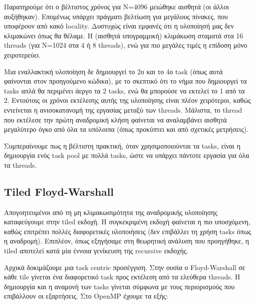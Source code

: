 \documentclass[12pt,titlepage]{article}
\begin{document}
Παρατηρούμε ότι ο βέλτιστος χρόνος για Ν=4096 μειώθηκε αισθητά (οι άλλοι
αυξήθηκαν). Επομένως υπάρχει πράγματι βελτίωση για μεγάλους πίνακες, που
υποφέρουν από κακό locality. Δυστυχώς είναι εμφανές ότι η υλοποίησή μας δεν
κλιμακώνει όπως θα θέλαμε. Η (αισθητά υπογραμμική) κλιμάκωση σταματά στα 16
threads (για N=1024 στα 4 ή 8 threads), ενώ για πιο μεγάλες τιμές η επίδοση μόνο
χειροτερεύει.

Μια εναλλακτική υλοποίηση δε δημιουργεί το 2ο και το 4ο task (όπως αυτά
φαίνονται στον προηγούμενο κώδικα), με το σκεπτικό ότι το νήμα που δημιουργεί τα
tasks απλά θα περιμένει άεργο τα 2 tasks, ενώ θα μπορούσε να εκτελεί το 1 από
τα 2. Εντούτοις οι χρόνοι εκτέλεσης αυτής της υλοποίησης είναι πλέον χειρότεροι,
καθώς εντείνεται η ανισοκατανομή της εργασίας μεταξύ των threads. Μάλιστα, το
thread που εκτέλεσε την πρώτη αναδρομική κλήση φαίνεται να αναλαμβάνει αισθητά
μεγαλύτερο όγκο από όλα τα υπόλοιπα (όπως προκύπτει και από σχετικές μετρήσεις).

Συμπεραίνουμε πως η βέλτιστη πρακτική, όταν χρησιμοποιούνται τα tasks, είναι η
δημιουργία ενός task pool με πολλά tasks, ώστε να υπάρχει πάντοτε εργασία για
όλα τα threads.

\newpage

\subsection{Tiled Floyd-Warshall}

Απογοητευμένοι από τη μη κλιμακωσιμότητα της αναδρομικής υλοποίησης καταφεύγουμε
στην tiled εκδοχή. Η συγκεκριμένη εκδοχή φαίνεται η πιο υποσχόμενη, καθώς
επιτρέπει πολλές διαφορετικές υλοποιήσεις (δεν επιβάλλει τη χρήση tasks όπως η
αναδρομή). Επιπλέον, όπως εξηγήσαμε στη θεωρητική ανάλυση που προηγήθηκε, η
tiled αποτελεί κατά μία έννοια γενίκευση της recursive εκδοχής.

Αρχικά δοκιμάζουμε μια task centric προσέγγιση. Στην ουσία ο Floyd-Warshall σε
κάθε tile γίνεται ένα διαφορετικό task προς εκτέλεση από τα ελεύθερα threads. Η
δημιουργία και η αναμονή των tasks γίνεται σύμφωνα με τους περιορισμούς που
επιβάλλουν οι εξαρτήσεις. Στο OpenMP έχουμε τα εξής:
\end{document}
